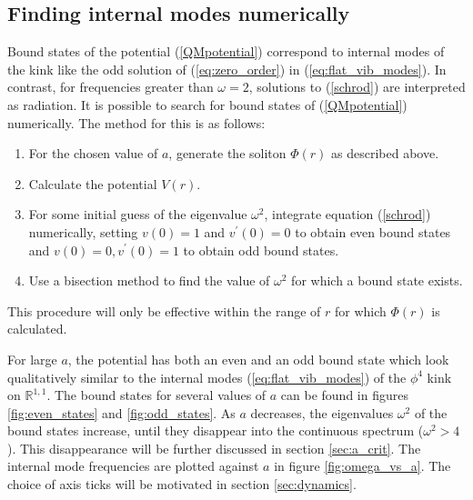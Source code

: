 \subsection{Finding internal modes numerically}
\label{sec:finding_bound_states_numerically}
Bound states of the potential (\ref{QMpotential}) correspond to internal modes of the kink like the odd solution of (\ref{eq:zero_order}) in (\ref{eq:flat_vib_modes}). In contrast, for frequencies greater than $\omega = 2$, solutions to (\ref{schrod}) are interpreted as radiation. It is possible to search for bound states of (\ref{QMpotential}) numerically. The method for this is as follows:
\begin{enumerate}
\item For the chosen value of $a$, generate the soliton $\Phi(r)$ as described above.
\item Calculate the potential $V(r)$.
\item For some initial guess of the eigenvalue $\omega^2$, integrate equation ({\ref{schrod}}) numerically, setting $v(0)=1$ and $v^\prime (0)=0$ to obtain even bound states and $v(0)=0,v^\prime(0)=1$ to obtain odd bound states.
\item Use a bisection method to find the value of $\omega^2$ for which a bound state exists.
\end{enumerate}
This procedure will only be effective within the range of $r$ for which $\Phi(r)$ is calculated.

For large $a$, the potential has both an even and an odd bound state which look qualitatively similar to the internal modes (\ref{eq:flat_vib_modes}) of the $\phi^4$ kink on $\mathbb{R}^{1,1}$. The bound states for several values of $a$ can be found in figures \ref{fig:even_states} and \ref{fig:odd_states}. As $a$ decreases, the eigenvalues $\omega^2$ of the bound states increase, until they disappear into the continuous spectrum ($\omega^2>4$). This disappearance will be further discussed in section \ref{sec:a_crit}. The internal mode frequencies are plotted against $a$ in figure \ref{fig:omega_vs_a}. The choice of axis ticks will be motivated in section \ref{sec:dynamics}.



